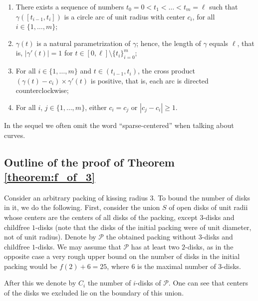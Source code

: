 \begin{enumerate}[label=(\alph*)]
  \item There exists a sequence of numbers $t_0 = 0 < t_1 < \ldots < t_m=\ell$ such that $\gamma([t_{i-1}, t_i])$ is a circle arc of unit radius with center $c_i$, for all $i\in\{1, \ldots, m\}$;
  \item $\gamma(t)$ is a natural parametrization of $\gamma$; hence, the length of $\gamma$ equals $\ell$, that is, $|\gamma'(t)| = 1$ for $t\in[0, \ell]\setminus\{t_i\}_{i=0}^m$;
  \item For all $i\in\{1, \ldots, m\}$ and $t\in(t_{i-1}, t_i)$, the cross product $(\gamma(t) - c_i)\times \gamma'(t)$ is positive, that is, each arc is directed counterclockwise;
  \item For all $i$, $j\in\{1, \ldots, m\}$, either $c_i = c_j$ or $|c_j - c_i|\geq 1$.
\end{enumerate}

In the sequel we often omit the word ``sparse-centered'' when talking about curves.

\subsection{Outline of the proof of Theorem \ref{theorem:f_of_3}}

Consider an arbitrary packing of kissing radius $3$. To bound the number of disks in it, we do the following. First, consider the union $S$ of open disks of unit radii whose centers are the centers of all disks of the packing, except $3$-disks and childfree $1$-disks (note that the disks of the initial packing were of unit diameter, not of unit radius). Denote by $\mathcal{P}$ the obtained packing without $3$-disks and childfree $1$-disks. We may assume that $\mathcal{P}$ has at least two $2$-disks, as in the opposite case a very rough upper bound on the number of disks in the initial packing would be $f(2) + 6 = 25$, where $6$ is the maximal number of $3$-disks. %

After this we denote by $C_i$ the number of $i$-disks of $\mathcal{P}$.
One can see that centers of the disks we excluded lie on the boundary of this union.

